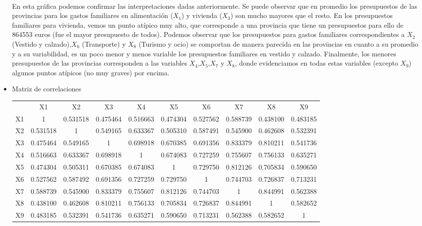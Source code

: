\documentclass[report,oneside]{revcoles}
\begin{document}
\begin{itemize}
~\\En esta gráfica podemos confirmar las interpretaciones dadas anteriormente. Se puede observar que en promedio los presupuestos de las provincias para los gastos familiares en alimentación ($X_1$) y vivienda ($X_3$) son mucho mayores que el resto. En los presupuestos familiares para vivienda, vemos un punto atípico muy alto, que corresponde a una provincia que tiene un presupuestos para ello de 864553 euros (fue el mayor presupuesto de todos). Podemos observar que los presupuestos para gastos familiares correspondientes a $X_2$ (Vestido y calzado),$X_6$ (Transporte) y $X_8$ (Turismo y ocio) se comportan de manera parecida en las provincias en cuanto a su promedio y a su variabilidad, es un poco menor y menos variable los presupuestos familiares en vestido y calzado. Finalmente, los menores presupuestos de las provincias corresponden a las variables $X_4$,$X_5$,$X_7$ y $X_8$, donde evidenciamos en todas estas variables (excepto $X_9$) algunos puntos atípicos (no muy graves) por encima.

\item Matriz de correlaciones
\begin{center}
\resizebox{15cm}{!} {
\begin{tabular}{cccccccccc}
 
 & X1 & X2 & X3 & X4 & X5 & X6 & X7 & X8 & X9\\ 

X1 & 1 &0.531518& 0.475464& 0.516663& 0.474304& 0.527562& 0.588739& 0.438100& 0.483185 \\ 

X2 & 0.531518 &1& 0.549165& 0.633367& 0.505310& 0.587491& 0.545900& 0.462608& 0.532391 \\ 
 
X3 & 0.475464& 0.549165& 1& 0.698918& 0.670385& 0.691356& 0.833379& 0.810211& 0.541736 \\ 

X4 & 0.516663 &0.633367 &0.698918 &1 &0.674083 &0.727259 &0.755607 &0.756133 &0.635271 \\ 

X5 & 0.474304 &0.505311 &0.670385& 0.674083& 1& 0.729750& 0.812126& 0.705834 &0.590650 \\ 

X6 & 0.527562 &0.587492 &0.691356 &0.727259 &0.729750 &1 &0.744703 &0.726837 &0.713231 \\ 

X7 & 0.588739 &0.545900& 0.833379& 0.755607& 0.812126& 0.744703 &1& 0.844991& 0.562388 \\ 
 
X8 & 0.438100 &0.462608 &0.810211 &0.756133 &0.705834 &0.726837 &0.844991 &1 &0.582652 \\ 

X9 & 0.483185 &0.532391& 0.541736& 0.635271& 0.590650& 0.713231& 0.562388& 0.582652& 1 \\ 

\end{tabular}
} 
\end{center}
\end{itemize}
\end{document}
